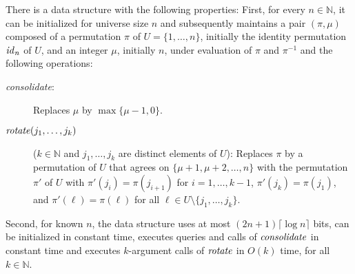 \documentclass[envcountsame,envcountsect,undated,nolinenumbers]{lnthi}
\def\Tvn#1{\hbox{\textit{#1\/}}}
\def\Tceil#1{\lceil #1\rceil}
\def\TbbbN{\mathbb{N}}
\begin{document}
\begin{lemma}
\label{lem:permutation}There is a data structure with the following properties:
First, for every $n\in\TbbbN$, it can be
initialized for universe size $n$ and
subsequently maintains a pair $(\pi,\mu)$
composed of a permutation $\pi$ of $U=\{1,\ldots,n\}$,
initially the identity permutation
$\Tvn{id}_n$ of $U$, and an integer $\mu$, initially $n$,
under evaluation of $\pi$ and $\pi^{-1}$
and the following operations:

\begin{description}
\item[{\normalfont \Tvn{consolidate}:}]
Replaces $\mu$ by $\max\{\mu-1,0\}$.
\item[{\normalfont $\Tvn{rotate}(j_1,\ldots,j_k)$}]
($k\in\TbbbN$ and $j_1,\ldots,j_k$ are distinct
elements of $U$):
Replaces $\pi$ by a permutation of $U$ that agrees
on $\{\mu+1,\mu+2,\ldots,n\}$ with the permutation
$\pi'$ of $U$ with $\pi'(j_i)=\pi(j_{i+1})$ for
$i=1,\ldots,k-1$, $\pi'(j_k)=\pi(j_1)$,
and $\pi'(\ell)=\pi(\ell)$ for all
$\ell\in U\setminus\{j_1,\ldots,j_k\}$.
\end{description}

\noindent
Second, for known $n$, the data structure uses at most
$(2 n+1)\Tceil{\log n}$ bits,
can be initialized in constant time, executes queries
and calls of $\Tvn{consolidate}$ in constant time and
executes $k$-argument calls of $\Tvn{rotate}$
in $O(k)$ time, for all $k\in\TbbbN$.
\end{lemma}
\end{document}
